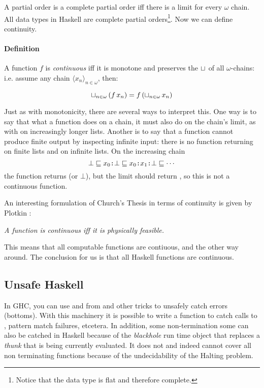 A partial order is a complete partial order iff there is a limit for
every $\omega$ chain. All data types in Haskell are complete partial
orders\footnote{Notice that the data type  is flat and therefore complete.}. Now we can
define continuity.

\paragraph{Definition} A function $f$ is \emph{continuous} iff it is
monotone and preserves the $\sqcup_{ }$ of all $\omega$-chains: i.e.
assume any chain $\langle x_n \rangle_{n \in \omega}$, then:

\begin{equation*}
\sqcup_{n \in \omega} \, (f \, x_n) = f \, (\sqcup_{n \in \omega} \, x_n)
\end{equation*}

Just as with monotonicity, there are several ways to interpret
this. One way is to say that what a function does on a chain, it must
also do on the chain's limit, as with  on increasingly longer
lists. Another is to say that a function cannot produce finite output by
inspecting infinite input: there is no function
 returning  on finite lists and
 on infinite lists. On the increasing chain
$$ \bot \sqsubseteq x_0 \hs{:} \bot \sqsubseteq x_0 \hs{:} x_1 \hs{:} \bot
\sqsubseteq \cdots$$
the function  returns  (or $\bot$), but the
limit should return , so this is not a continuous function.

An interesting formulation of Church's Thesis in terms of continuity
is given by Plotkin \cite{domains}:

\begin{center}
\emph{A function is continuous iff it is physically feasible.}
\end{center}

This means that all computable functions are contiuous, and the other
way around. The conclusion for us is that all Haskell functions are
continuous.

\subsection{Unsafe Haskell}
In GHC, you can use  and  from
 and other tricks to unsafely catch errors
(bottoms). With this machinery it is possible to write a function
 to catch calls to , pattern
match failures, etcetera. In addition, some non-termination some can
also be catched in Haskell because of the \emph{blackhole} run time
object that replaces a \emph{thunk} that is being currently
evaluated. It does not and indeed cannot cover all non terminating
functions because of the undecidability of the Halting problem.

